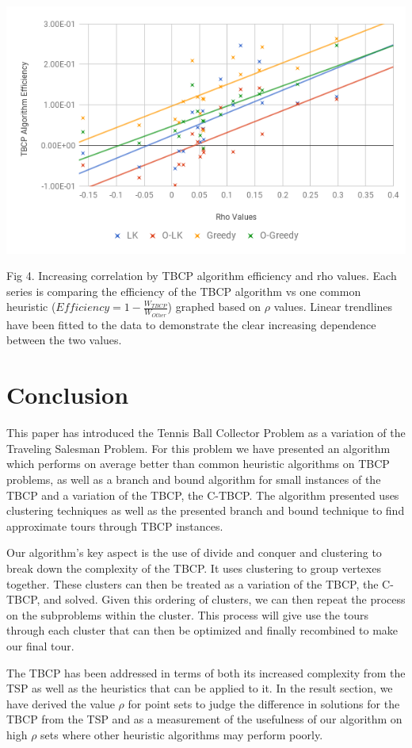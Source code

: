 \documentclass[sigconf, anonymous, pdftex]{acmart}
\begin{document}
\includegraphics[scale = .38]{rhoValue}

Fig 4. Increasing correlation by TBCP algorithm efficiency and rho values. Each series is comparing the efficiency of the TBCP algorithm vs one common heuristic ($Efficiency = 1 - \frac{W_{TBCP}}{W_{Other}}$) graphed based on $\rho$ values. Linear trendlines have been fitted to the data to demonstrate the clear increasing dependence between the two values.

\section{Conclusion}

This paper has introduced the Tennis Ball Collector Problem as a variation of the Traveling Salesman Problem. For this problem we have presented an algorithm which performs on average better than common heuristic algorithms on TBCP problems, as well as a branch and bound algorithm for small instances of the TBCP and a variation of the TBCP, the C-TBCP. The algorithm presented uses clustering techniques as well as the presented branch and bound technique to find approximate tours through TBCP instances. 

Our algorithm's key aspect is the use of divide and conquer and clustering to break down the complexity of the TBCP. It uses clustering to group vertexes together. These clusters can then be treated as a variation of the TBCP, the C-TBCP, and solved. Given this ordering of clusters, we can then repeat the process on the subproblems within the cluster. This process will give use the tours through each cluster that can then be optimized and finally recombined to make our final tour.

The TBCP has been addressed in terms of both its increased complexity from the TSP as well as the heuristics that can be applied to it. In the result section, we have derived the value $\rho$ for point sets to judge the difference in solutions for the TBCP from the TSP and as a measurement of the usefulness of our algorithm on high $\rho$ sets where other heuristic algorithms may perform poorly.
\end{document}
